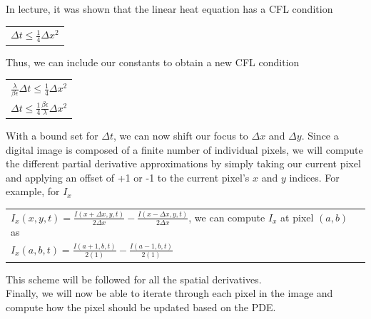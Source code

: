 \documentclass{article}
\begin{document}
  \noindent
  In lecture, it was shown that the linear heat equation has a CFL condition
  \begin{center}
    \begin{tabular}{l}
      $\Delta t \leq \frac{1}{4} \Delta x^2$
    \end{tabular}
  \end{center}

  \noindent
  Thus, we can include our constants to obtain a new CFL condition
  \begin{center}
    \begin{tabular}{l}
      \vspace{12pt}
      $\frac{\lambda}{\beta \epsilon} \Delta t \leq \frac{1}{4} \Delta x^2$\\
      $\Delta t \leq \frac{1}{4} \frac{\beta \epsilon}{\lambda} \Delta x^2$\\
    \end{tabular}
  \end{center}

  \newpage
  \noindent
  With a bound set for  $\Delta t$, we can now shift our focus to $\Delta x$ and $\Delta y$. Since
  a digital image is composed of a finite number of individual pixels, we will compute the different
  partial derivative approximations by simply taking our current pixel and applying an offset of
  +1 or -1 to the current pixel's $x$ and $y$ indices. For example, for $I_{x}$
  \begin{center}
    \begin{tabular}{l}
      $I_{x}(x,y,t) = \frac{I(x+\Delta x,y,t)}{2\Delta x} - \frac{I(x-\Delta x,y,t)}{2\Delta x}$, we can
      \vspace{12pt}
      compute $I_{x}$ at pixel $(a,b)$ as\\
      $I_{x}(a,b,t) = \frac{I(a+1,b,t)}{2(1)} - \frac{I(a-1,b,t)}{2(1)}$
    \end{tabular}
  \end{center}
  \noindent
  This scheme will be followed for all the spatial derivatives.\\

  \noindent
  Finally, we will now be able to iterate through each pixel in the image and compute how the pixel should
  be updated based on the PDE.

  \newpage
\end{document}
